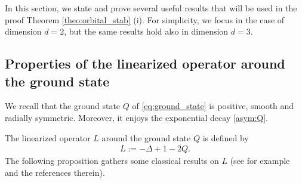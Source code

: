 \documentclass[reqno,10pt]{amsart}
\numberwithin{equation}{section}
\begin{document}
 In this section, we state and prove several useful results that will be used in the proof Theorem \ref{theo:orbital_stab} (i). For simplicity, we focus in the case of dimension $d=2$, but the same results hold also in dimension $d=3$.
	
	\subsection{Properties of the linearized operator around the ground state}
	We recall that the ground state $Q$ of \eqref{eq:ground_state} is positive, smooth and radially symmetric. Moreover, it enjoys the exponential decay \eqref{asym:Q}. 
	
	The linearized operator $L$ around the ground state $Q$ is defined by
	\begin{align}\label{defi:L}
		L:= -\Delta+1-2Q.
	\end{align}
	The following proposition gathers some classical results on $L$ (see for example \cite{CMPS16} and the references therein).
	
\end{document}

